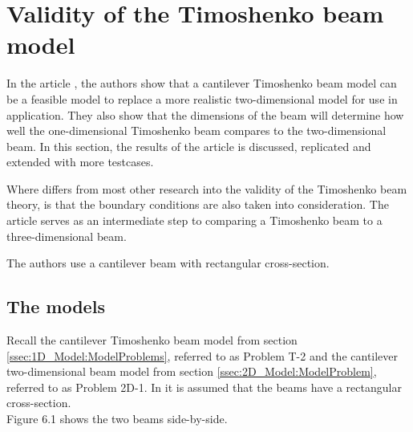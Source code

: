 \documentclass[../../main.tex]{subfiles}
\begin{document}
\section{Validity of the Timoshenko beam model}
In the article \cite{LVV09}, the authors show that a cantilever Timoshenko beam model can be a feasible model to replace a more realistic two-dimensional model for use in application. They also show that the dimensions of the beam will determine how well the one-dimensional Timoshenko beam compares to the two-dimensional beam. In this section, the results of the article is discussed, replicated and extended with more testcases.

Where \cite{LVV09} differs from most other research into the validity of the Timoshenko beam theory, is that the boundary conditions are also taken into consideration. The article serves as an intermediate step to comparing a Timoshenko beam to a three-dimensional beam.

The authors use a cantilever beam with rectangular cross-section.


\subsection{The models}
Recall the cantilever Timoshenko beam model from section \ref{ssec:1D_Model:ModelProblems}, referred to as Problem T-2 and the cantilever two-dimensional beam model from section \ref{ssec:2D_Model:ModelProblem}, referred to as Problem 2D-1. In \cite{LVV09} it is assumed that the beams have a rectangular cross-section.\\

Figure 6.1 shows the two beams side-by-side.
\end{document}
